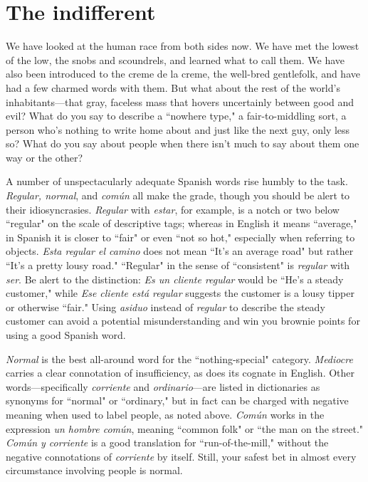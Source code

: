 \section{The indifferent}

We have looked at the human race from both sides now. We
have met the lowest of the low, the snobs and scoundrels, and learned
what to call them. We have also been introduced to the creme de la
creme, the well-bred gentlefolk, and have had a few charmed words
with them. But what about the rest of the world's inhabitants---that
gray, faceless mass that hovers uncertainly between good and evil?
What do you say to describe a ``nowhere type," a fair-to-middling sort,
a person who's nothing to write home about and just like the next guy,
only less so? What do you say about people when there isn't much to
say about them one way or the other?

A number of unspectacularly adequate Spanish words rise
humbly to the task. \emph{Regular, normal}, and \emph{común} all make the grade,
though you should be alert to their idiosyncrasies. \emph{Regular} with \emph{estar},
for example, is a notch or two below ``regular" on the scale of descriptive tags; whereas in English it means ``average," in Spanish it is closer
to ``fair" or even ``not so hot," especially when referring to objects.
\emph{Esta regular el camino} does not mean ``It's an average road" but rather
``It's a pretty lousy road." ``Regular" in the sense of ``consistent" is
\emph{regular} with \emph{ser}. Be alert to the distinction: \emph{Es un cliente regular}
would be ``He's a steady customer," while \emph{Ese cliente está regular} suggests the customer is a lousy tipper or otherwise ``fair." Using \emph{asiduo}
instead of \emph{regular} to describe the steady customer can avoid a potential
misunderstanding and win you brownie points for using a good Spanish word.

\emph{Normal} is the best all-around word for the ``nothing-special"
category. \emph{Mediocre} carries a clear connotation of insufficiency, as does
its cognate in English. Other words---specifically \emph{corriente} and \emph{ordinario}---are listed in dictionaries as synonyms for ``normal" or ``ordinary,"
but in fact can be charged with negative meaning when used to label
people, as noted above. \emph{Común} works in the expression \emph{un hombre común}, meaning ``common folk" or ``the man on the street." \emph{Común y
	corriente} is a good translation for ``run-of-the-mill," without the negative connotations of \emph{corriente} by itself. Still, your safest bet in almost
every circumstance involving people is normal.

